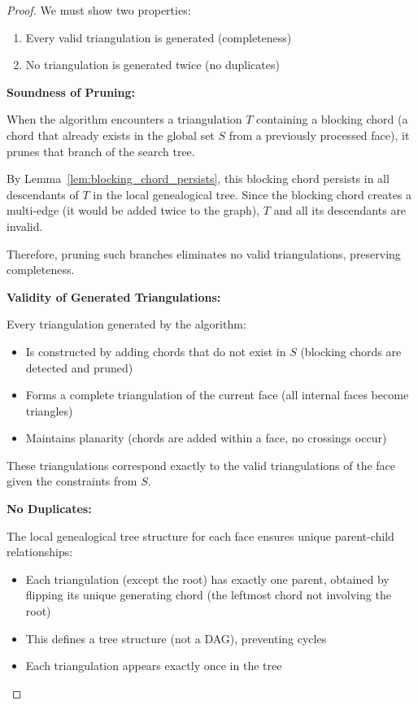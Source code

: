\documentclass[12pt,a4paper]{article}
\theoremstyle{definition}
\theoremstyle{remark}
\begin{document}
\begin{proof}
We must show two properties:
\begin{enumerate}
    \item Every valid triangulation is generated (completeness)
    \item No triangulation is generated twice (no duplicates)
\end{enumerate}

\textbf{Soundness of Pruning:}

When the algorithm encounters a triangulation $T$ containing a blocking chord (a chord that already exists in the global set $S$ from a previously processed face), it prunes that branch of the search tree.

By Lemma~\ref{lem:blocking_chord_persists}, this blocking chord persists in all descendants of $T$ in the local genealogical tree. Since the blocking chord creates a multi-edge (it would be added twice to the graph), $T$ and all its descendants are invalid.

Therefore, pruning such branches eliminates no valid triangulations, preserving completeness.

\textbf{Validity of Generated Triangulations:}

Every triangulation generated by the algorithm:
\begin{itemize}
    \item Is constructed by adding chords that do not exist in $S$ (blocking chords are detected and pruned)
    \item Forms a complete triangulation of the current face (all internal faces become triangles)
    \item Maintains planarity (chords are added within a face, no crossings occur)
\end{itemize}

These triangulations correspond exactly to the valid triangulations of the face given the constraints from $S$.

\textbf{No Duplicates:}

The local genealogical tree structure for each face ensures unique parent-child relationships:
\begin{itemize}
    \item Each triangulation (except the root) has exactly one parent, obtained by flipping its unique generating chord (the leftmost chord not involving the root)
    \item This defines a tree structure (not a DAG), preventing cycles
    \item Each triangulation appears exactly once in the tree
\end{itemize}


\end{proof}
\end{document}
